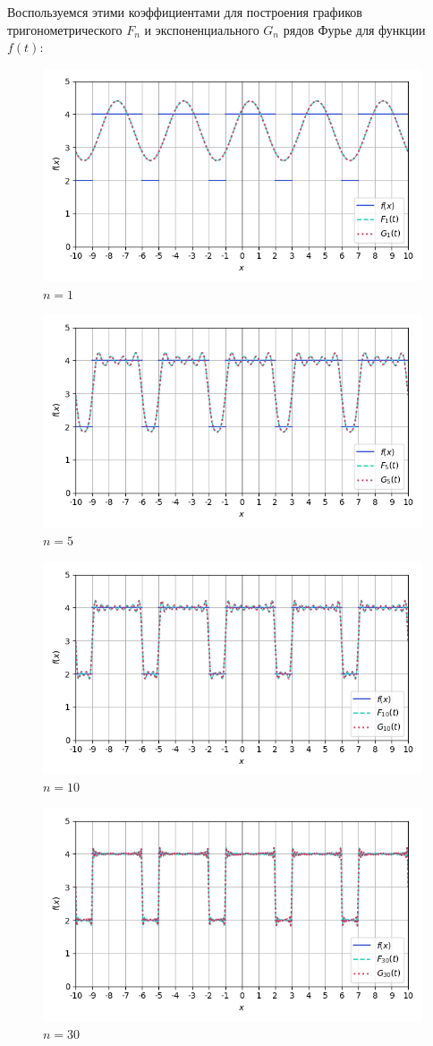 \documentclass[a4paper]{article}
\begin{document}
Воспользуемся этими коэффициентами для построения графиков тригонометрического $F_n$ и экспоненциального $G_n$ рядов Фурье для функции $f(t)$:
\begin{figure}[H]
    \centering
    \includegraphics[width=0.7\linewidth]{square_wave/Im1.png}
    \caption{$n = 1$}
\end{figure}
\begin{figure}[H]
    \centering
    \includegraphics[width=0.7\linewidth]{square_wave/Im5.png}
    \caption{$n = 5$}
\end{figure}
\begin{figure}[H]
    \centering
    \includegraphics[width=0.7\linewidth]{square_wave/Im10.png}
    \caption{$n = 10$}
\end{figure}
\begin{figure}[H]
    \centering
    \includegraphics[width=0.7\linewidth]{square_wave/Im30.png}
    \caption{$n = 30$}
\end{figure}
\end{document}
